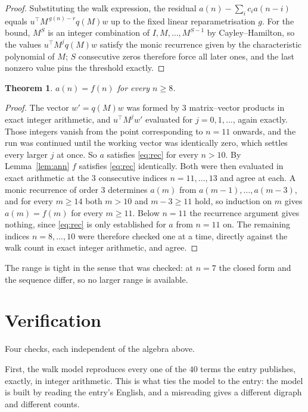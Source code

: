 \documentclass[11pt,a4paper]{article}
\theoremstyle{plain}
\newtheorem{theorem}{Theorem}
\theoremstyle{definition}
\begin{document}
\begin{proof}
Substituting the walk expression, the residual $a(n)-\sum_ic_ia(n-i)$ equals
$u^{\!\top}M^{\,g(n)-r}q(M)w$ up to the fixed linear reparametrisation $g$. For the bound,
$M^{S}$ is an integer combination of $I,M,\dots,M^{S-1}$ by Cayley--Hamilton, so the values
$u^{\!\top}M^{j}q(M)w$ satisfy the monic recurrence given by the characteristic polynomial of
$M$; $S$ consecutive zeros therefore force all later ones, and the last nonzero value pins the
threshold exactly.
\end{proof}

\begin{theorem}
$a(n)=f(n)$ for every $n\ge8$.
\end{theorem}

\begin{proof}
The vector $w'=q(M)w$ was formed by $3$ matrix--vector products in exact integer
arithmetic, and $u^{\!\top}M^{j}w'$ evaluated for $j=0,1,\dots$, again exactly. Those integers
vanish from the point corresponding to $n=11$ onwards, and the run was continued until the
working vector was identically zero, which settles every larger $j$ at once. So $a$ satisfies
\eqref{eq:rec} for every $n>10$. By Lemma~\ref{lem:ann} $f$ satisfies \eqref{eq:rec}
identically. Both were then evaluated in exact arithmetic at the $3$ consecutive indices
$n=11,\dots,13$ and agree at each. A monic recurrence of order $3$
determines $a(m)$ from $a(m-1),\dots,a(m-3)$, and for every $m\ge14$ both
$m>10$ and $m-3\ge11$ hold, so induction on $m$ gives $a(m)=f(m)$ for every
$m\ge11$.
Below $n=11$ the recurrence argument gives nothing, since \eqref{eq:rec} is only
established for $a$ from $n=11$ on. The remaining indices $n=8,\dots,10$ were
therefore checked one at a time, directly against the walk count in exact integer arithmetic,
and agree.
\end{proof}

The range is tight in the sense that was checked: at $n=7$ the closed form and the sequence differ, so no larger range is available.

\section{Verification}

Four checks, each independent of the algebra above.

First, the walk model reproduces every one of the $40$ terms the entry publishes,
exactly, in integer arithmetic. This is what ties the model to the entry: the model is built
by reading the entry's English, and a misreading gives a different digraph and different
counts.
\end{document}
